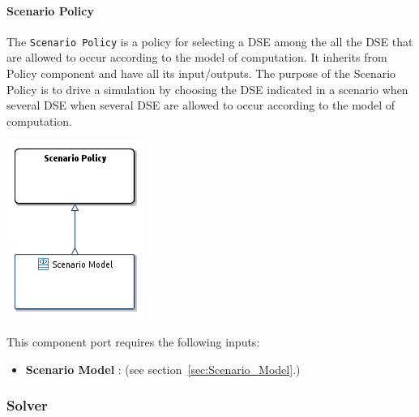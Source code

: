 \documentclass{gemoc} %
\begin{document}
\paragraph{Scenario Policy}
\label{sec:Scenario_Policy}
The \texttt{Scenario Policy} is a policy for selecting a DSE among the all the DSE that are allowed to occur according to the model of computation.
It inherits from Policy component and have all its input/outputs.
The purpose of the Scenario Policy is to drive a simulation by choosing the DSE indicated in a scenario when several DSE when several DSE are allowed to occur according to the model of computation.
\begin{center}
\includegraphics*[trim=0.0cm 0.0cm 0cm 0.0cm, clip=true]{../images/generated/Generated_Scenario_Policy.png}
\end{center}

This component port requires the following inputs:
\begin{itemize}
  \item \textbf{Scenario Model} :
(see section~\ref{sec:Scenario_Model}.)
\end{itemize}




\subsubsection{Solver}
\label{sec:Solver}

\end{document}
